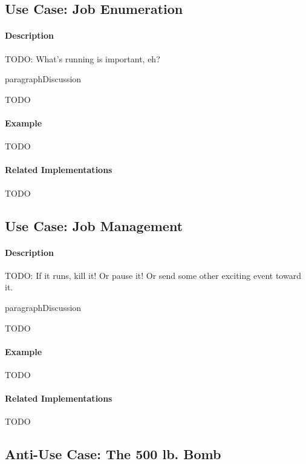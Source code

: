 \subsection{Use Case: Job Enumeration}

\paragraph{Description}

{\Large TODO:} What's running is important, eh?

paragraph{Discussion}

{\Large TODO}

\paragraph{Example}

{\Large TODO}

\paragraph{Related Implementations}

{\Large TODO}

\subsection{Use Case: Job Management}

\paragraph{Description}

{\Large TODO:} If it runs, kill it!  Or pause it!  Or send some other exciting event toward it.

paragraph{Discussion}

{\Large TODO}

\paragraph{Example}

{\Large TODO}

\paragraph{Related Implementations}

{\Large TODO}

\subsection{Anti-Use Case: The 500 lb. Bomb}

